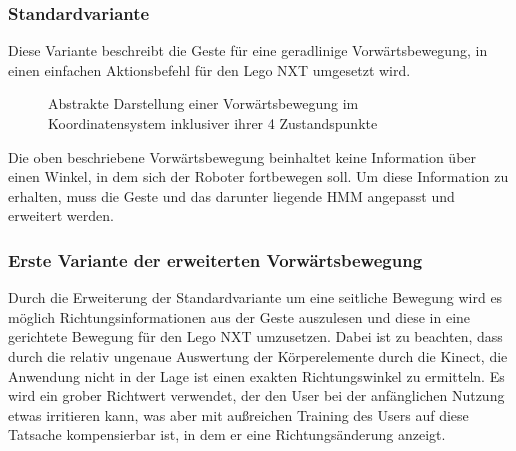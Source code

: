 \subsubsection{Standardvariante}

Diese Variante beschreibt die Geste f\"ur eine geradlinige Vorw\"artsbewegung, in einen einfachen Aktionsbefehl f\"ur den Lego NXT umgesetzt wird.

\begin{figure}[htb]
    \centering
    \caption[Abstrakte Darstellung einer Vorw\"artsbewegung im Koordinatensystem inklusiver ihrer 4 Zustandspunkte]{Abstrakte Darstellung einer  Vorw\"artsbewegung im Koordinatensystem inklusiver ihrer 4 Zustandspunkte}
    \label{fig:Forward_ideal}
\end{figure}

Die oben beschriebene Vorw\"artsbewegung beinhaltet keine Information \"uber einen Winkel, in dem sich der Roboter fortbewegen soll. Um diese Information zu erhalten, muss die Geste und das darunter liegende \acrshort{HMM} angepasst und erweitert werden.

\subsubsection{Erste Variante der erweiterten Vorw\"artsbewegung}

Durch die Erweiterung der Standardvariante um eine seitliche Bewegung wird es m\"oglich Richtungsinformationen aus der Geste auszulesen und diese in eine gerichtete Bewegung f\"ur den Lego NXT umzusetzen. Dabei ist zu beachten, dass durch die relativ ungenaue Auswertung der K\"orperelemente durch die Kinect, die Anwendung nicht in der Lage ist einen exakten Richtungswinkel zu ermitteln. Es wird ein grober Richtwert verwendet, der den User bei der anf\"anglichen Nutzung etwas irritieren kann, was aber mit au\ss reichen Training des Users auf diese Tatsache kompensierbar ist, in dem er eine Richtungs\"anderung anzeigt.

